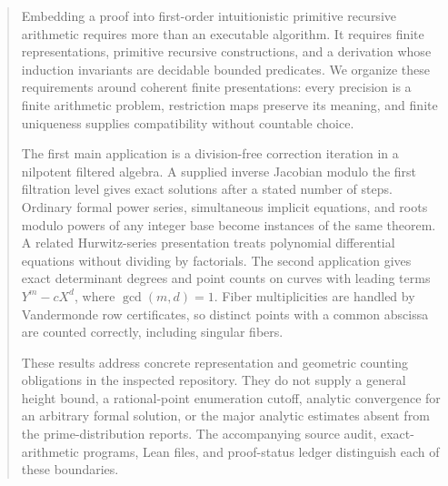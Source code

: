 \documentclass[11pt,oneside]{article}
\theoremstyle{definition}
\theoremstyle{remark}\newtheorem{remark}[theorem]{Remark}
\begin{document}
\begin{abstract}
Embedding a proof into first-order intuitionistic primitive recursive
arithmetic requires more than an executable algorithm. It requires finite
representations, primitive recursive constructions, and a derivation whose
induction invariants are decidable bounded predicates. We organize these
requirements around coherent finite presentations: every precision is a
finite arithmetic problem, restriction maps preserve its meaning, and
finite uniqueness supplies compatibility without countable choice.

The first main application is a division-free correction iteration in a
nilpotent filtered algebra. A supplied inverse Jacobian modulo the first
filtration level gives exact solutions after a stated number of steps.
Ordinary formal power series, simultaneous implicit equations, and roots
modulo powers of any integer base become instances of the same theorem.
A related Hurwitz-series presentation treats polynomial differential
equations without dividing by factorials. The second application gives
exact determinant degrees and point counts on curves with leading terms
\(Y^m-cX^d\), where \(\gcd(m,d)=1\). Fiber multiplicities are handled by
Vandermonde row certificates, so distinct points with a common abscissa
are counted correctly, including singular fibers.

These results address concrete representation and geometric counting
obligations in the inspected repository. They do not supply a general
height bound, a rational-point enumeration cutoff, analytic convergence
for an arbitrary formal solution, or the major analytic estimates absent
from the prime-distribution reports. The accompanying source audit,
exact-arithmetic programs, Lean files, and proof-status ledger distinguish
each of these boundaries.
\end{abstract}
\tableofcontents
\newpage








\end{document}
